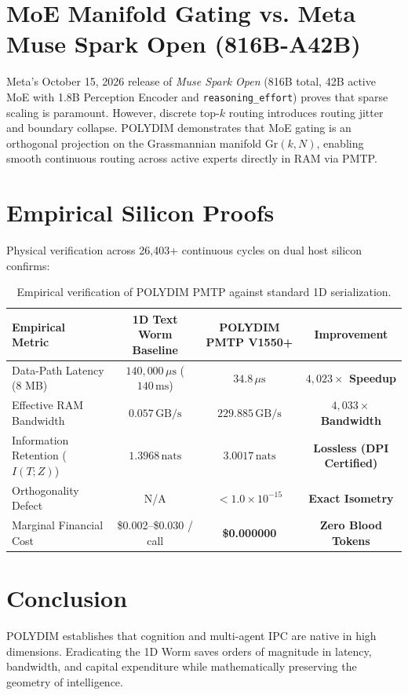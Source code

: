 \documentclass[11pt,a4paper]{article}
\begin{document}
\section{MoE Manifold Gating vs. Meta Muse Spark Open (816B-A42B)}
Meta's October 15, 2026 release of \textit{Muse Spark Open} (816B total, 42B active MoE with 1.8B Perception Encoder and \texttt{reasoning\_effort}) proves that sparse scaling is paramount. However, discrete top-$k$ routing introduces routing jitter and boundary collapse. POLYDIM demonstrates that MoE gating is an orthogonal projection on the Grassmannian manifold $\mathrm{Gr}(k, N)$, enabling smooth continuous routing across active experts directly in RAM via PMTP.

\section{Empirical Silicon Proofs}
Physical verification across 26,403+ continuous cycles on dual host silicon confirms:
\begin{table}[h]
\centering
\begin{tabular}{lccc}
\toprule
\textbf{Empirical Metric} & \textbf{1D Text Worm Baseline} & \textbf{POLYDIM PMTP V1550+} & \textbf{Improvement} \\
\midrule
Data-Path Latency (8 MB) & $140,000\,\mu\text{s}$ ($140\,\text{ms}$) & \textbf{$34.8\,\mu\text{s}$} & \textbf{$4,023\times$ Speedup} \\
Effective RAM Bandwidth & $0.057\,\text{GB/s}$ & \textbf{$229.885\,\text{GB/s}$} & \textbf{$4,033\times$ Bandwidth} \\
Information Retention ($I(T; Z)$) & $1.3968\,\text{nats}$ & \textbf{$3.0017\,\text{nats}$} & \textbf{Lossless (DPI Certified)} \\
Orthogonality Defect & N/A & \textbf{$< 1.0 \times 10^{-15}$} & \textbf{Exact Isometry} \\
Marginal Financial Cost & \$0.002--\$0.030 / call & \textbf{\$0.000000} & \textbf{Zero Blood Tokens} \\
\bottomrule
\end{tabular}
\caption{Empirical verification of POLYDIM PMTP against standard 1D serialization.}
\end{table}

\section{Conclusion}
POLYDIM establishes that cognition and multi-agent IPC are native in high dimensions. Eradicating the 1D Worm saves orders of magnitude in latency, bandwidth, and capital expenditure while mathematically preserving the geometry of intelligence.
\end{document}
